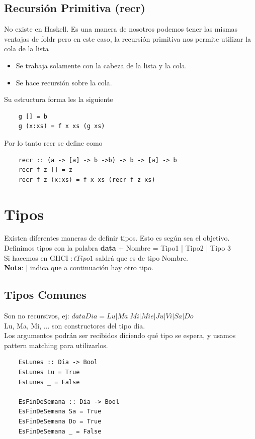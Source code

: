 \documentclass[10pt,a4paper]{article}
\begin{document}
\subsection*{Recursión Primitiva (recr)}
No existe en Haskell. Es una manera de nosotros podemos tener las mismas ventajas de foldr pero en este caso, la recursión primitiva nos permite utilizar la cola de la lista 
\begin{itemize}
    \item Se trabaja solamente con la cabeza de la lista y la cola.
    \item Se hace recursión sobre la cola.
\end{itemize}
Su estructura forma les la siguiente 
\begin{lstlisting}
    g [] = b
    g (x:xs) = f x xs (g xs)
\end{lstlisting}
Por lo tanto recr se define como 
\begin{lstlisting}
    recr :: (a -> [a] -> b ->b) -> b -> [a] -> b 
    recr f z [] = z
    recr f z (x:xs) = f x xs (recr f z xs)
\end{lstlisting}
\section*{Tipos}
Existen diferentes maneras de definir tipos. Esto es según sea el objetivo.
Definimos tipos con la palabra \textbf{data} + Nombre = Tipo1 | Tipo2 | Tipo 3 \\
Si hacemos en GHCI $:t Tipo1$ saldrá que es de tipo Nombre. \\
\textbf{Nota}: $|$ indica que a continuación hay otro tipo.
\subsection*{Tipos Comunes}
Son no recursivos, ej: $data Dia = Lu | Ma | Mi | Mie | Ju | Vi | Sa | Do $ \\
Lu, Ma, Mi, ... son constructores del tipo dia. \\
Los argumentos podrán ser recibidos diciendo qué tipo se espera, y usamos pattern matching para utilizarlos.
\begin{lstlisting}
    EsLunes :: Dia -> Bool
    EsLunes Lu = True 
    EsLunes _ = False 

    EsFinDeSemana :: Dia -> Bool
    EsFinDeSemana Sa = True 
    EsFinDeSemana Do = True 
    EsFinDeSemana _ = False 
\end{lstlisting}
\end{document}

